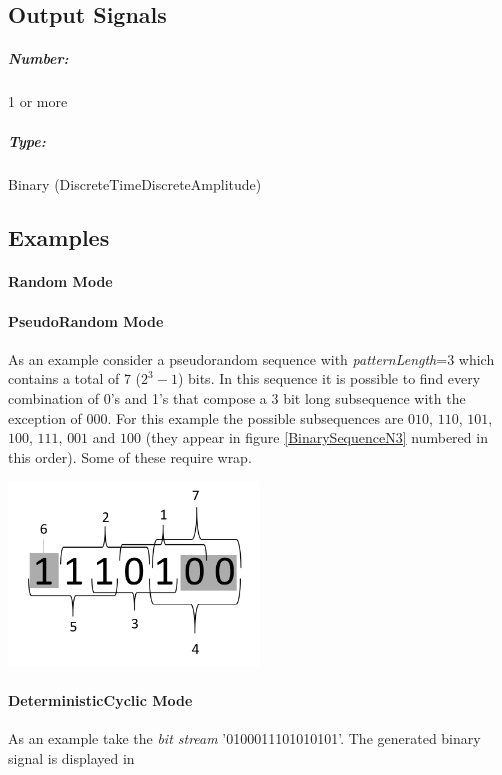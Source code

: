 \documentclass[a4paper]{article}
\begin{document}
\subsection*{Output Signals}

\subparagraph*{Number:} 1 or more

\subparagraph*{Type:} Binary (DiscreteTimeDiscreteAmplitude)

\subsection*{Examples} 

\paragraph*{Random Mode}

\paragraph*{PseudoRandom Mode}
As an example consider a pseudorandom sequence with \textit{patternLength}=3 which contains a total of 7 ($2^3-1$) bits. In this sequence it is possible to find every combination of 0's and 1's that compose a 3 bit long subsequence with the exception of $000$. For this example the possible subsequences are $010$, $110$, $101$, $100$, $111$, $001$ and $100$ (they appear in figure \ref{BinarySequenceN3} numbered in this order). Some of these require wrap. 

\begin{center}
\includegraphics[width=0.5\textwidth]{BinarySequenceN3}
\label{BinarySequenceN3}
\end{center}

\paragraph*{DeterministicCyclic Mode}

As an example take the \textit{bit stream} '0100011101010101'. The generated binary signal is displayed in
\end{document}

